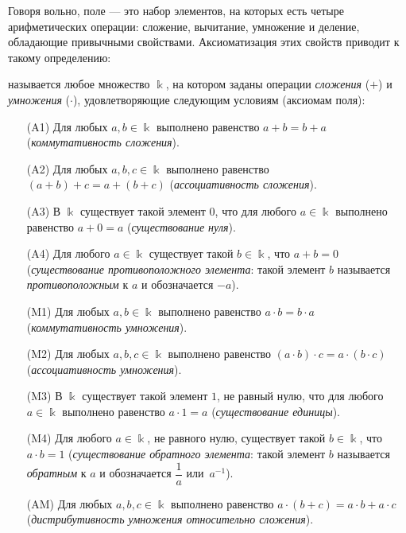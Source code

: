 \documentclass[a4paper,12pt]{article}
\begin{document}

\smallskip

Говоря вольно, поле --- это набор элементов, на которых
есть четыре арифметических операции: сложение, вычитание, умножение и
деление, обладающие привычными свойствами.
Аксиоматизация этих свойств приводит к такому определению:

\smallskip

 называется любое множество $\Bbbk$, на котором заданы операции
\emph{сложения} ($+$) и \emph{умножения} ($\cdot$),
удовлетворяющие следующим условиям (аксиомам поля):
\begin{itemize}
\item[(A1)]
Для любых $a,b\in\Bbbk$ выполнено равенство $a+b=b+a$
(\emph{коммутативность сложения}).
\item[(A2)]
Для любых $a,b,c\in\Bbbk$ выполнено равенство $(a+b)+c=a+(b+c)$
(\emph{ассоциативность сложения}).
\item[(A3)]
В $\Bbbk$ существует такой элемент $0$, что для любого $a\in\Bbbk$
выполнено равенство
$a+0=a$ (\emph{существование нуля}).
\item[(A4)]
Для любого $a\in\Bbbk$ существует такой $b\in\Bbbk$, что $a+b=0$
(\emph{существование противоположного элемента}: такой элемент $b$
называется \emph{противоположным} к $a$ и обозначается $-a$).
\item[(M1)]
Для любых $a,b\in\Bbbk$ выполнено равенство $a\cdot b=b\cdot a$
(\emph{коммутативность умножения}).
\item[(M2)]
Для любых $a,b,c\in\Bbbk$ выполнено равенство $(a\cdot b)\cdot
c=a\cdot (b\cdot c)$ (\emph{ассоциативность умножения}).
\item[(M3)]
В $\Bbbk$ существует такой элемент $1$, не равный нулю, что для
любого $a\in\Bbbk$ выполнено равенство $a\cdot 1=a$
(\emph{существование единицы}).
\item[(M4)]
Для любого $a\in\Bbbk$, не равного нулю, существует такой
$b\in\Bbbk$, что $a\cdot b=1$ (\emph{существование обратного
элемента}: такой элемент $b$ называется \emph{обратным} к $a$ и
обозначается $\dfrac1a$ или~$a^{-1}$).
\item[(AM)]
Для любых $a,b,c\in\Bbbk$ выполнено равенство $a\cdot(b+c)=a\cdot
b + a\cdot c$ (\emph{дистрибутивность умножения относительно
сложения}).
\end{itemize}

\end{document}
